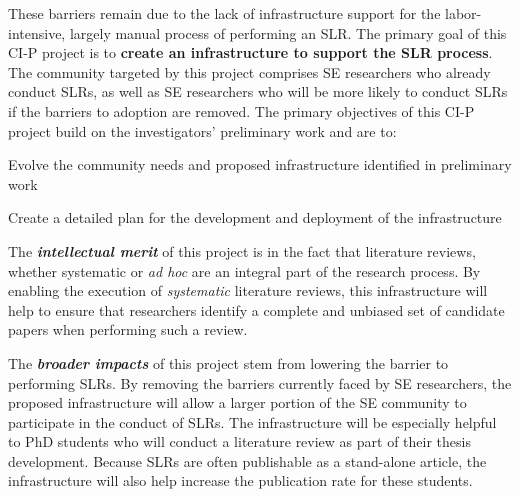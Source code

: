 These barriers remain due to the lack of infrastructure support for the labor-intensive, largely manual process of performing an SLR. 
The primary goal of this CI-P project is to \textbf{create an infrastructure to support the SLR process}.
The community targeted by this project comprises SE researchers who already conduct SLRs, as well as SE researchers who will be more likely to conduct SLRs if the barriers to adoption are removed.
The primary objectives of this CI-P project build on the investigators' preliminary work and are to:
\begin{itemize*}
   \vspace*{-3pt}
	\item{Evolve the community needs and proposed infrastructure identified in preliminary work}
   \vspace*{6pt}
	\item{Create a detailed plan for the development and deployment of the infrastructure}
   \vspace*{-3pt}
\end{itemize*}

The {\bfseries\sffamily\slshape intellectual merit} of this project is in the fact that literature reviews, whether systematic or \emph{ad hoc} are an integral part of the research process. By enabling the execution of \emph{systematic} literature reviews, this infrastructure will help to ensure that researchers identify a complete and unbiased set of candidate papers when performing such a review.

The {\bfseries\sffamily\slshape broader impacts} of this project stem from lowering the barrier to performing SLRs. By removing the barriers currently faced by SE researchers, the proposed infrastructure will allow a larger portion of the SE community to participate in the conduct of SLRs. The infrastructure will be especially helpful to PhD students who will conduct a literature review as part of their thesis development. Because SLRs are often publishable as a stand-alone article, the infrastructure will also help increase the publication rate for these students.


